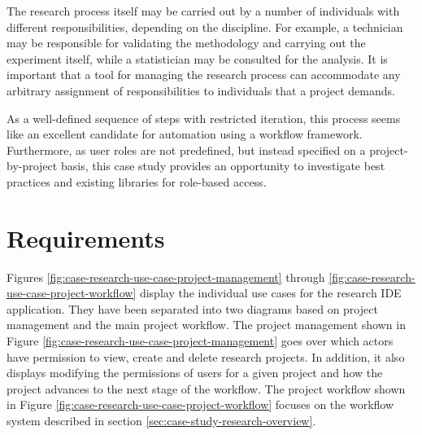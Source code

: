 The research process itself may be carried out by a number of individuals with different responsibilities, depending on the discipline. For example, a technician may be responsible for validating the methodology and carrying out the experiment itself, while a statistician may be consulted for the analysis. It is important that a tool for managing the research process can accommodate any arbitrary assignment of responsibilities to individuals that a project demands.

As a well-defined sequence of steps with restricted iteration, this process seems like an excellent candidate for automation using a workflow framework. Furthermore, as user roles are not predefined, but instead specified on a project-by-project basis, this case study provides an opportunity to investigate best practices and existing libraries for role-based access.



\section {Requirements}

  Figures \ref{fig:case-research-use-case-project-management} through \ref{fig:case-research-use-case-project-workflow} display the individual use cases for the research IDE application. They have been separated into two diagrams based on project management and the main project workflow. The project management shown in Figure \ref{fig:case-research-use-case-project-management} goes over which actors have permission to view, create and delete research projects. In addition, it also displays modifying the permissions of users for a given project and how the project advances to the next stage of the workflow. The project workflow shown in Figure \ref{fig:case-research-use-case-project-workflow} focuses on the workflow system described in section \ref{sec:case-study-research-overview}.

